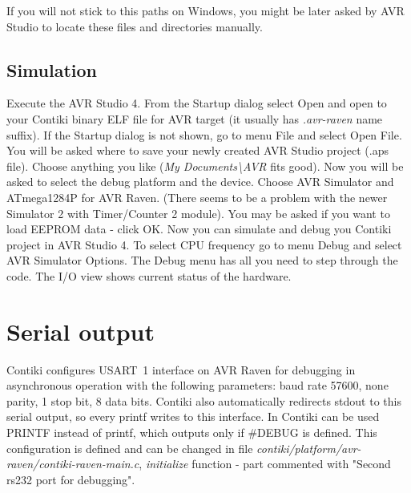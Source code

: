 \documentclass{article}
\begin{document}
{{If you will not stick to this paths on Windows,
you might be later asked by AVR Studio to locate these files and directories manually.

\subsection{Simulation}
Execute the AVR Studio 4.
From the Startup dialog select Open and open to your Contiki binary ELF file for AVR target
(it usually has {\it{.avr-raven}} name suffix).
If the Startup dialog is not shown, go to menu File and select Open File.
You will be asked where to save your newly created AVR Studio project (.aps file).
Choose anything you like ({\it{My Documents\textbackslash AVR}} fits good).
Now you will be asked to select the debug platform and the device.
Choose AVR Simulator and ATmega1284P for AVR Raven. (There seems to be a problem with the newer Simulator 2 with Timer/Counter 2 module).
You may be asked if you want to load EEPROM data - click OK.
Now you can simulate and debug you Contiki project in AVR Studio 4.
To select CPU frequency go to menu Debug and select AVR Simulator Options.
The Debug menu has all you need to step through the code. The I/O view shows current status of the hardware.


\section{Serial output}
Contiki configures USART~1 interface on AVR Raven for debugging in asynchronous operation
with the following parameters:
baud rate 57600, none parity, 1 stop bit, 8 data bits.
Contiki also automatically redirects stdout to this serial output, so every printf
writes to this interface.
In Contiki can be used PRINTF instead of printf, which outputs only if \#DEBUG is defined.
This configuration is defined and can be changed in
file {\it{contiki/platform/avr-raven/contiki-raven-main.c}},
{\it{initialize}} function - part commented with "Second rs232 port for debugging".

}}
\end{document}

